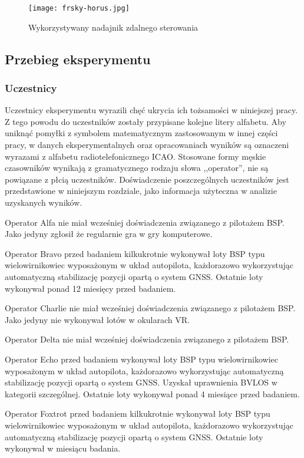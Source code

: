 \begin{figure}[!h]
    \centering \texttt{[image: frsky-horus.jpg]}
    \caption{Wykorzystywany nadajnik zdalnego sterowania}
    \label{fig:frsky-horus}
\end{figure}

\subsection{Przebieg eksperymentu}

\subsubsection{Uczestnicy}
Uczestnicy eksperymentu wyrazili chęć ukrycia ich tożsamości w niniejszej pracy. Z tego powodu do uczestników zostały przypisane kolejne litery alfabetu. Aby uniknąć pomyłki z symbolem matematycznym zastosowanym w innej części pracy, w danych eksperymentalnych oraz opracowaniach wyników są oznaczeni wyrazami z alfabetu radiotelefonicznego ICAO. Stosowane formy męskie czasowników wynikają z gramatycznego rodzaju słowa ,,operator'', nie są powiązane z płcią uczestników. Doświadczenie poszczególnych uczestników jest przedstawione w niniejszym rozdziale, jako informacja użyteczna w analizie uzyskanych wyników.

Operator Alfa nie miał wcześniej doświadczenia związanego z pilotażem BSP. Jako jedyny zgłosił że regularnie gra w gry komputerowe.

Operator Bravo przed badaniem kilkukrotnie wykonywał loty BSP typu wielowirnikowiec wyposażonym w układ autopilota, każdorazowo wykorzystując automatyczną stabilizację pozycji opartą o system GNSS. Ostatnie loty wykonywał ponad 12 miesięcy przed badaniem.

Operator Charlie nie miał wcześniej doświadczenia związanego z pilotażem BSP. Jako jedyny nie wykonywał lotów w okularach VR.

Operator Delta nie miał wcześniej doświadczenia związanego z pilotażem BSP.

Operator Echo przed badaniem wykonywał loty BSP typu wielowirnikowiec wyposażonym w układ autopilota, każdorazowo wykorzystując automatyczną stabilizację pozycji opartą o system GNSS. Uzyskał uprawnienia BVLOS w kategorii szczególnej. Ostatnie loty wykonywał ponad 4 miesiące przed badaniem.

Operator Foxtrot przed badaniem kilkukrotnie wykonywał loty BSP typu wielowirnikowiec wyposażonym w układ autopilota, każdorazowo wykorzystując automatyczną stabilizację pozycji opartą o system GNSS. Ostatnie loty wykonywał w miesiącu badania.


